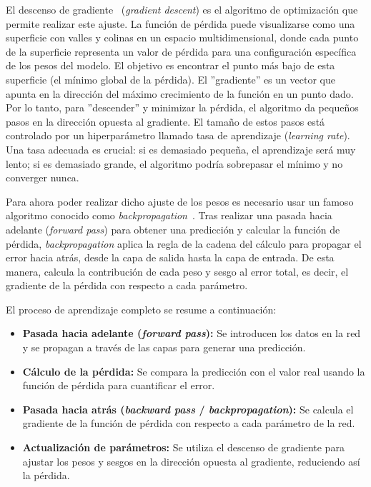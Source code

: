 El descenso de gradiente~\cite{amari2006theory} (\textit{gradient descent}) es el algoritmo de optimización que permite realizar este ajuste. La función de pérdida puede visualizarse como una superficie con valles y colinas en un espacio multidimensional, donde cada punto de la superficie representa un valor de pérdida para una configuración específica de los pesos del modelo. El objetivo es encontrar el punto más bajo de esta superficie (el mínimo global de la pérdida). El ''gradiente'' es un vector que apunta en la dirección del máximo crecimiento de la función en un punto dado. Por lo tanto, para ''descender'' y minimizar la pérdida, el algoritmo da pequeños pasos en la dirección opuesta al gradiente. El tamaño de estos pasos está controlado por un hiperparámetro llamado tasa de aprendizaje (\textit{learning rate}). Una tasa adecuada es crucial: si es demasiado pequeña, el aprendizaje será muy lento; si es demasiado grande, el algoritmo podría sobrepasar el mínimo y no converger nunca.

Para ahora poder realizar dicho ajuste de los pesos es necesario usar un famoso algoritmo conocido como \textit{backpropagation}~\cite{rumelhart1986learning}. Tras realizar una pasada hacia adelante (\textit{forward pass}) para obtener una predicción y calcular la función de pérdida, \textit{backpropagation} aplica la regla de la cadena del cálculo para propagar el error hacia atrás, desde la capa de salida hasta la capa de entrada. De esta manera, calcula la contribución de cada peso y sesgo al error total, es decir, el gradiente de la pérdida con respecto a cada parámetro.

El proceso de aprendizaje completo se resume a continuación:

\begin{itemize}
	\item \textbf{Pasada hacia adelante (\textit{forward pass}):} Se introducen los datos en la red y se propagan a través de las capas para generar una predicción.
	
	\item \textbf{Cálculo de la pérdida:} Se compara la predicción con el valor real usando la función de pérdida para cuantificar el error.

	\item \textbf{Pasada hacia atrás (\textit{backward pass} / \textit{backpropagation}):} Se calcula el gradiente de la función de pérdida con respecto a cada parámetro de la red.

	\item \textbf{Actualización de parámetros:} Se utiliza el descenso de gradiente para ajustar los pesos y sesgos en la dirección opuesta al gradiente, reduciendo así la pérdida.
\end{itemize}

